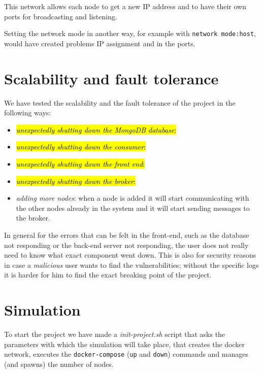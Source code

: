 \documentclass[conference]{IEEEtran}
\begin{document}
	This network allows each node to get a new IP address and to have their own ports for broadcasting and listening.
	
	Setting the network mode in another way, for example with \texttt{network mode:host}, would have created problems IP assignment and in the ports.
	
\section{Scalability and fault tolerance}

	We have tested the scalability and the fault tolerance of the project in the following ways:
	
	\begin{itemize}
		
		\item \hl{\textit{unexpectedly shutting down the MongoDB database}:}
		
		\item \hl{\textit{unexpectedly shutting down the consumer}:}
		
		\item \hl{\textit{unexpectedly shutting down the front end}:}
		
		\item \hl{\textit{unexpectedly shutting down the broker}:}
		
		\item \textit{adding more nodes}: when a node is added it will start communicating with the other nodes already in the system and it will start sending messages to the broker.
		
	\end{itemize}

	In general for the errors that can be felt in the front-end, such as the database not responding or the back-end server not responding, the user does not really need to know what exact component went down.
	This is also for security reasons in case a \textit{malicious} user wants to find the vulnerabilities; without the specific logs it is harder for him to find the exact breaking point of the project.
	
\section{Simulation}\label{sec:simulation}

	To start the project we have made a \textit{init-project.sh} script that asks the parameters with which the simulation will take place, that creates the docker network, executes the \texttt{docker-compose} (\texttt{up} and \texttt{down}) commands and manages (and spawns) the number of nodes.
	
\end{document}
